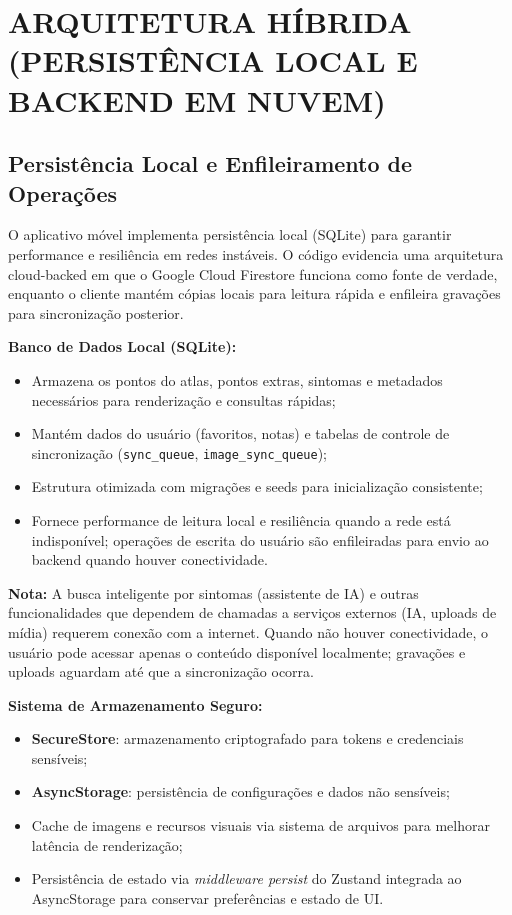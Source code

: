 
\section{ARQUITETURA HÍBRIDA (PERSISTÊNCIA LOCAL E BACKEND EM NUVEM)} \label{sec:arquitetura_hibrida}

\subsection{Persistência Local e Enfileiramento de Operações}

O aplicativo móvel implementa persistência local (SQLite) para garantir performance e resiliência em redes instáveis. O código evidencia uma arquitetura cloud-backed em que o Google Cloud Firestore funciona como fonte de verdade, enquanto o cliente mantém cópias locais para leitura rápida e enfileira gravações para sincronização posterior.

            \textbf{Banco de Dados Local (SQLite):}
\begin{itemize}
    \item Armazena os pontos do atlas, pontos extras, sintomas e metadados necessários para renderização e consultas rápidas;
    \item Mantém dados do usuário (favoritos, notas) e tabelas de controle de sincronização (\texttt{sync\_queue}, \texttt{image\_sync\_queue});
    \item Estrutura otimizada com migrações e seeds para inicialização consistente;
    \item Fornece performance de leitura local e resiliência quando a rede está indisponível; operações de escrita do usuário são enfileiradas para envio ao backend quando houver conectividade.
\end{itemize}

    \textbf{Nota:} A busca inteligente por sintomas (assistente de IA) e outras funcionalidades que dependem de chamadas a serviços externos (IA, uploads de mídia) requerem conexão com a internet. Quando não houver conectividade, o usuário pode acessar apenas o conteúdo disponível localmente; gravações e uploads aguardam até que a sincronização ocorra.

    \textbf{Sistema de Armazenamento Seguro:}
\begin{itemize}
    \item \textbf{SecureStore}: armazenamento criptografado para tokens e credenciais sensíveis;
    \item \textbf{AsyncStorage}: persistência de configurações e dados não sensíveis;
    \item Cache de imagens e recursos visuais via sistema de arquivos para melhorar latência de renderização;
    \item Persistência de estado via \textit{middleware persist} do Zustand integrada ao AsyncStorage para conservar preferências e estado de UI.
\end{itemize}

